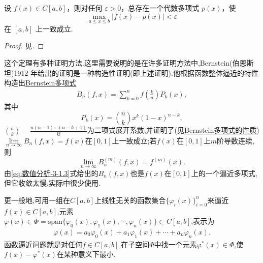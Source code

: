 \documentclass[../../main.tex]{subfiles}
\begin{document}
\begin{theorem}
设 \( f(x) \in C[a,b] \)，则对任何 \( \varepsilon > 0 \)，总存在一个代数多项式 \( p(x) \)，使
\[
\max_{a \leqslant x \leqslant b} | f(x) - p(x) | < \varepsilon
\]
在 \([a,b]\) 上一致成立.
\end{theorem}
\begin{proof}
见.
\end{proof}
\begin{remark}
这个定理有多种证明方法.这里需要说明的是在许多证明方法中,Bernstein(伯恩斯坦)1912 年给出的证明是一种构造性证明(即上述证明).他根据函数整体逼近的特性构造出\hyperref[definition:一维Bernstein多项式]{Bernstein多项式}
\begin{align}
B_n(f,x)=\sum_{k=0}^n f\left(\frac{k}{n}\right)P_k(x), \label{eq:数值分析-3-1.3}
\end{align}
其中
\[
P_k(x)=\binom{n}{k}x^k(1-x)^{n-k},
\]
$\binom{n}{k}=\frac{n(n-1)\cdots(n-k+1)}{k!}$为二项式展开系数,并证明了(见\hyperref[theorem:Bernstein多项式的性质]{Bernstein多项式的性质})$\lim\limits_{n\to\infty} B_n(f,x)=f(x)$在$[0,1]$上一致成立;若$f(x)$在$[0,1]$上$m$阶导数连续,则
\[
\lim\limits_{n\to\infty} B_n^{(m)}(f,x)=f^{(m)}(x).
\]
由\eqref{eq:数值分析-3-1.3}式给出的$B_n(f,x)$也是$f(x)$在$[0,1]$上的一个逼近多项式,但它收敛太慢,实际中很少使用.

更一般地,可用一组在$C[a,b]$上线性无关的函数集合$\{\varphi_i(x)\}_{i=0}^n$来逼近$f(x)\in C[a,b]$,元素$\varphi(x)\in \Phi=\text{span}\{\varphi_0(x),\varphi_1(x),\cdots,\varphi_n(x)\}\subset C[a,b]$,表示为
\begin{align}
\varphi(x)=a_0\varphi_0(x)+a_1\varphi_1(x)+\cdots+a_n\varphi_n(x). \label{eq:数值分析-3-1.4}
\end{align}
函数逼近问题就是对任何$f\in C[a,b]$,在子空间$\Phi$中找一个元素$\varphi^*(x)\in \Phi$,使$f(x)-\varphi^*(x)$在某种意义下最小.
\end{remark}
\end{document}
